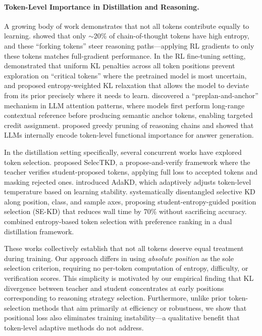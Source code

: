 \paragraph{Token-Level Importance in Distillation and Reasoning.}
A growing body of work demonstrates that not all tokens contribute equally to learning.
\citet{wang2025beyond8020} showed that only $\sim$20\% of chain-of-thought tokens have high entropy, and these ``forking tokens'' steer reasoning paths---applying RL gradients to only these tokens matches full-gradient performance.
In the RL fine-tuning setting, \citet{vassoyan2025ignorekl} demonstrated that uniform KL penalties across all token positions prevent exploration on ``critical tokens'' where the pretrained model is most uncertain, and proposed entropy-weighted KL relaxation that allows the model to deviate from its prior precisely where it needs to learn.
\citet{li2025preplan} discovered a ``preplan-and-anchor'' mechanism in LLM attention patterns, where models first perform long-range contextual reference before producing semantic anchor tokens, enabling targeted credit assignment.
\citet{singh2026functional} proposed greedy pruning of reasoning chains and showed that LLMs internally encode token-level functional importance for answer generation.

In the distillation setting specifically, several concurrent works have explored token selection.
\citet{huang2025selectkd} proposed SelecTKD, a propose-and-verify framework where the teacher verifies student-proposed tokens, applying full loss to accepted tokens and masking rejected ones.
\citet{xie2026adakd} introduced AdaKD, which adaptively adjusts token-level temperature based on learning stability.
\citet{tavor2026rethinking} systematically disentangled selective KD along position, class, and sample axes, proposing student-entropy-guided position selection (SE-KD) that reduces wall time by 70\% without sacrificing accuracy.
\citet{kim2026tsdkd} combined entropy-based token selection with preference ranking in a dual distillation framework.

These works collectively establish that not all tokens deserve equal treatment during training.
Our approach differs in using \emph{absolute position} as the sole selection criterion, requiring no per-token computation of entropy, difficulty, or verification scores.
This simplicity is motivated by our empirical finding that KL divergence between teacher and student concentrates at early positions corresponding to reasoning strategy selection.
Furthermore, unlike prior token-selection methods that aim primarily at efficiency or robustness, we show that positional loss also eliminates training instability---a qualitative benefit that token-level adaptive methods do not address.

